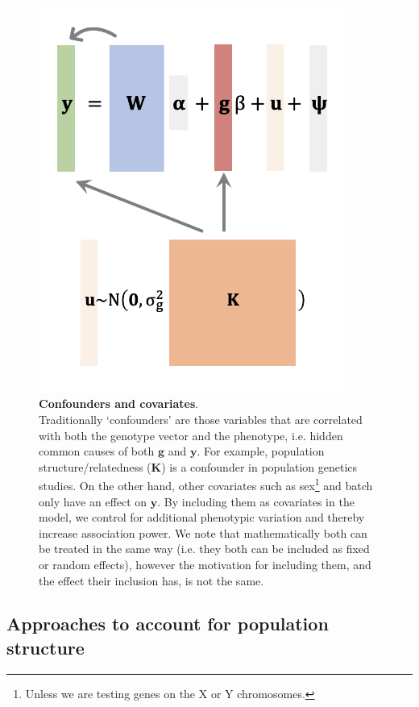 \begin{figure}[htbp]
\centering
\includegraphics[width=10cm]{Chapter2/Fig/confounders_covariates.png}
\caption[Confounders and covariates]{\textbf{Confounders and covariates}.\\
Traditionally `confounders' are those variables that are correlated with both the genotype vector and the phenotype, i.e. hidden common causes of both $\mathbf{g}$ and  $\mathbf{y}$. 
For example, population structure/relatedness ($\mathbf{K}$) is a confounder in population genetics studies. 
On the other hand, other covariates such as sex\footnote{Unless we are testing genes on the X or Y chromosomes.} and batch only have an effect on $\mathbf{y}$.
By including them as covariates in the model, we control for additional phenotypic variation and thereby increase association power. 
We note that mathematically both can be treated in the same way (i.e. they both can be included as fixed or random effects), however the motivation for including them, and the effect their inclusion has, is not the same.}
\label{fig:conf_cov}
\end{figure}

\subsection{Approaches to account for population structure}
\label{sec:pop_struct_noLMM}

